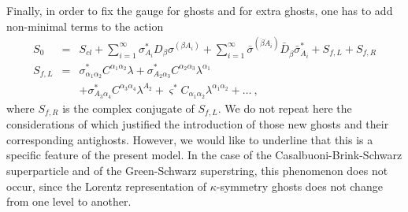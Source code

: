 \documentclass[a4paper,12pt]{article}
\begin{document}
Finally, in order to fix the gauge for ghosts and for extra ghosts, 
one has to add non-minimal terms to the action
\begin{eqnarray}
S_{0}&=&S_{cl}+ \sum^{\infty}_{i=1}\sigma_{A_i}^* D_\beta
\sigma^{(\beta A_i)} +   
\sum^{\infty}_{i= 1} \bar\sigma^{(\dot \beta \dot A_i)}  \bar D_{\dot
  \beta} \bar\sigma_{\dot A_i}^*  
+ S_{f,L}+S_{f,R}\nonumber\\
S_{f,L}&=&\sigma^*_{\alpha_1\alpha_2}C^{\alpha_1\alpha_2}\lambda+
\sigma^*_{A_2\alpha_3} C^{\alpha_2\alpha_3}\lambda^{\alpha_1}\nonumber\\
&& +\sigma^*_{A_3\alpha_4} C^{\alpha_3\alpha_4}\lambda^{A_2}
+\varsigma^* C_{\alpha_1\alpha_2}\lambda^{\alpha_1\alpha_2}
+ \ldots \ ,  \label{Sminf}
\end{eqnarray}
where $S_{f,R}$ is the complex conjugate of $S_{f,L}$. We do not
repeat here the considerations of \cite{GPZ} which justified the
introduction of those new ghosts and their corresponding antighosts.
However, we would like to underline that this is a specific feature of
the present model. In the case of the Casalbuoni-Brink-Schwarz
superparticle and of the Green-Schwarz superstring, this phenomenon
does not occur, since the Lorentz representation of $\kappa$-symmetry
ghosts does not change from one level to another.
\end{document}
